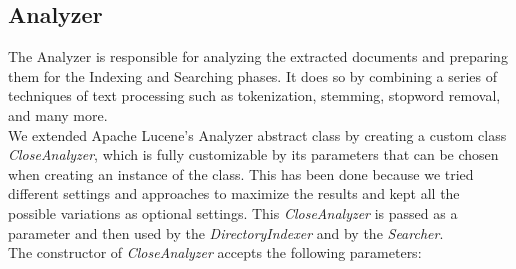 \subsection{Analyzer} \label{analyzer_subsec}
The Analyzer is responsible for analyzing the extracted documents and preparing them for the Indexing and Searching phases.
It does so by combining a series of techniques of text processing such as tokenization, stemming, stopword removal, and many more.\\
We extended Apache Lucene's Analyzer abstract class \cite{luceneanalyzer} by creating a custom class \textit{CloseAnalyzer}, which is fully customizable by its parameters that can be chosen when creating an instance of the class.
This has been done because we tried different settings and approaches to maximize the results and kept all the possible variations as optional settings.
This \textit{CloseAnalyzer} is passed as a parameter and then used by the \textit{DirectoryIndexer} and by the \textit{Searcher}. \\
The constructor of \textit{CloseAnalyzer} accepts the following parameters:
